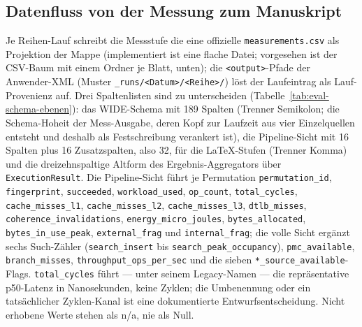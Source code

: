 \begin{nurlang}
\subsection{Datenfluss von der Messung zum Manuskript}\label{sec:eval-dataflow}
Je Reihen-Lauf schreibt die Messstufe die eine offizielle \texttt{measurements.csv} als Projektion der
Mappe (implementiert ist eine flache Datei; vorgesehen ist der CSV-Baum mit einem Ordner je Blatt, unten); die
\texttt{<output>}-Pfade der Anwender-XML (Muster \texttt{\_runs/<Datum>/<Reihe>/}) löst der
Laufeintrag als Lauf-Provenienz auf. Drei Spaltenlisten sind zu unterscheiden
(Tabelle~\ref{tab:eval-schema-ebenen}): das WIDE-Schema mit 189 Spalten (Trenner Semikolon; die
Schema-Hoheit der Mess-Ausgabe, deren Kopf zur Laufzeit aus vier Einzelquellen entsteht und deshalb als
Festschreibung verankert ist), die Pipeline-Sicht mit 16 Spalten plus 16 Zusatzspalten, also 32, für die
LaTeX-Stufen (Trenner Komma) und die dreizehnspaltige Altform des Ergebnis-Aggregators über
\texttt{ExecutionResult}. Die Pipeline-Sicht führt je Permutation \texttt{permutation\_id},
\texttt{fingerprint}, \texttt{succeeded}, \texttt{workload\_used}, \texttt{op\_count},
\texttt{total\_cycles}, \texttt{cache\_misses\_l1}, \texttt{cache\_misses\_l2},
\texttt{cache\_misses\_l3}, \texttt{dtlb\_misses}, \texttt{coherence\_\allowbreak{}invalidations},
\texttt{energy\_\allowbreak{}micro\_\allowbreak{}joules}, \texttt{bytes\_\allowbreak{}allocated}, \texttt{bytes\_\allowbreak{}in\_\allowbreak{}use\_\allowbreak{}peak},
\texttt{external\_\allowbreak{}frag} und \texttt{internal\_\allowbreak{}frag}; die volle Sicht ergänzt sechs Such-Zähler
(\texttt{search\_\allowbreak{}insert} bis \texttt{search\_\allowbreak{}peak\_\allowbreak{}occupancy}), \texttt{pmc\_\allowbreak{}available},
\texttt{branch\_\allowbreak{}misses}, \texttt{throughput\_\allowbreak{}ops\_\allowbreak{}per\_\allowbreak{}sec} und die sieben
\texttt{*\_source\_available}-Flags. \texttt{total\_cycles} führt --- unter seinem Legacy-Namen ---
die repräsentative p50-Latenz in Nanosekunden, keine Zyklen; die Umbenennung oder ein tatsächlicher
Zyklen-Kanal ist eine dokumentierte Entwurfsentscheidung. Nicht erhobene Werte stehen als n/a, nie als Null.
\begin{table}[htbp]\centering\footnotesize
\begin{tabular}{@{}l>{\raggedright\arraybackslash}p{1.5cm}>{\raggedright\arraybackslash}p{1.9cm}>{\raggedright\arraybackslash}p{4.6cm}>{\raggedright\arraybackslash}p{4.0cm}@{}}

\end{tabular}
\end{table}
\end{nurlang}
